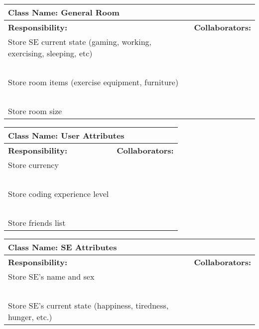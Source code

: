 \documentclass[]{article}
\begin{document}
\begin{table}[H]
    \centering
    \begin{tabular}{|p{7.5cm}|p{7.5cm}|}
        \hline
        \multicolumn{2}{|l|}{\textbf{Class Name:} General Room}\\
        \hline
        \textbf{Responsibility:} & \textbf{Collaborators:}\\
        \hline
        Store SE current state (gaming, working, exercising, sleeping, etc) & ~\\
        ~ & ~\\
        Store room items (exercise equipment, furniture) & ~\\
        ~ & ~\\
        Store room size & ~\\
        \hline
    \end{tabular}
\end{table}

\begin{table}[H]
    \centering
    \begin{tabular}{|p{7.5cm}|p{7.5cm}|}
        \hline
        \multicolumn{2}{|l|}{\textbf{Class Name:} User Attributes}\\
        \hline
        \textbf{Responsibility:} & \textbf{Collaborators:}\\
        \hline
        Store currency & ~\\
        ~ & ~\\
        Store coding experience level & ~\\
        ~ & ~\\
        Store friends list & ~\\
        \hline
    \end{tabular}
\end{table}

\begin{table}[H]
    \centering
    \begin{tabular}{|p{7.5cm}|p{7.5cm}|}
        \hline
        \multicolumn{2}{|l|}{\textbf{Class Name:} SE Attributes}\\
        \hline
        \textbf{Responsibility:} & \textbf{Collaborators:}\\
        \hline
        Store SE’s name and sex & ~\\
        ~ & ~\\
        Store SE’s current state (happiness, tiredness, hunger, etc.) & ~\\
        \hline
    \end{tabular}
\end{table}
\end{document}
